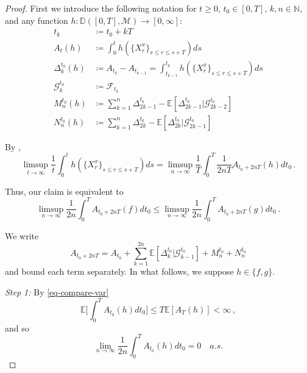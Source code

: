 \documentclass[final]{amsart}
\numberwithin{thm}{section}
\numberwithin{equation}{section}
\newcommand{\E}{\mathbb{E}}
\newcommand{\F}{\mathcal{F}}
\newcommand{\G}{\mathcal{G}}
\newcommand{\mcM}{\mathcal{M}}
\newcommand{\N}{\mathbb{N}}
\newcommand{\D}{\mathbb{D}}
\begin{document}
\begin{proof}
    First we introduce the following notation for $t \geq 0$, $t_0 \in [0,T]$, $k,n \in \N$, and any function $h: \D([0,T],\mcM) \to [0,\infty]$:
    \begin{align*}
        t_k &\coloneqq t_0 + kT \\
        A_t(h) &\coloneqq \int_0^t h(\{X_r^x\}_{s\leq r \leq s+T})ds \\
        \Delta_k^{t_0}(h) &\coloneqq A_{t_k} - A_{t_{k-1}} = \int_{t_{k-1}}^{t_k} h(\{X_r^x\}_{s\leq r \leq s+T})ds \\
        \G_k^{t_0} &\coloneqq \F_{t_k} \\
        M_n^{t_0}(h) &\coloneqq \sum_{k=1}^n \Delta_{2k-1}^{t_0} - \E[\Delta_{2k-1}^{t_0} |\G^{t_0}_{2k-2}] \\
        N_n^{t_0}(h) &\coloneqq \sum_{k=1}^n \Delta_{2k}^{t_0} - \E[\Delta_{2k}^{t_0} |\G^{t_0}_{2k-1}]
    \end{align*}
    
    

    By ,
    \begin{equation}\label{eq:limsup-A-equals-h}
        \limsup_{t \to \infty} \frac{1}{t}\int_0^t h(\{X_r^x\}_{s\leq r \leq s+T})ds = \limsup_{n \to \infty} \frac{1}{T}\int_0^T \frac{1}{2nT} A_{t_0 + 2nT}(h)dt_0 \,.
    \end{equation}
    

    Thus, our claim is equivalent to
    \begin{equation}\label{eq-quiv-claim-for-comparison-result}
        \limsup_{n \to \infty} \frac{1}{2n}\int_0^T A_{t_0 + 2nT}(f)dt_0 \leq \limsup_{n \to \infty} \frac{1}{2n}\int_0^T A_{t_0 + 2nT}(g)dt_0 \,.
    \end{equation}

     We write
    \begin{equation}\label{eq:break-up-A}
        A_{t_0 + 2nT} = A_{t_0} + \sum_{k=1}^{2n} \E[\Delta_k^{t_0} |\G^{t_0}_{k-1}] + M_n^{t_0} + N_n^{t_0}
    \end{equation}
     and bound each term separately. In what follows, we suppose $h \in \{f,g\}$.

      \textit{Step 1:}
      By \eqref{eq-compare-var}
     \begin{equation*}
         \E\Big[\int_0^T A_{t_0}(h) dt_0\Big] \leq T\E[A_T(h)] < \infty \,,
     \end{equation*}
     and so
     $$\lim_{n \to \infty} \frac{1}{2n}\int_0^T A_{t_0}(h)dt_0 = 0 \quad a.s.$$


\end{proof}
\end{document}
